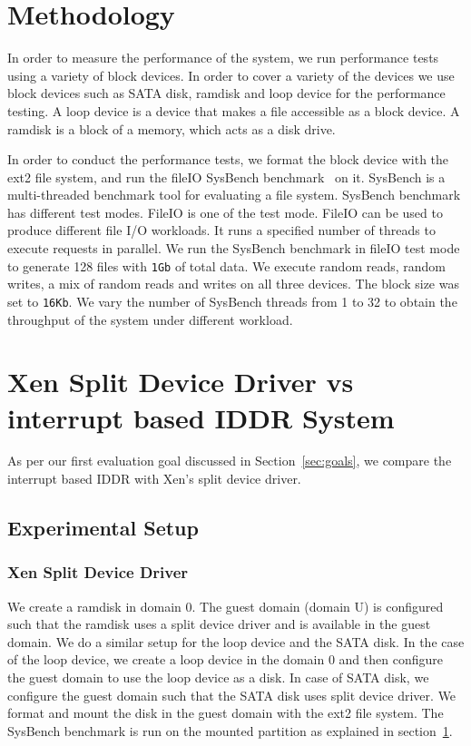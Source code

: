 \section{Methodology}
\label{sec:methodology}
In order to measure the performance of the system, we run performance tests using a variety of block devices. In order to cover a variety of the devices we use block devices such as SATA disk, ramdisk and loop device for the performance testing. A loop device is a device that makes a file accessible as a block device. A ramdisk is a block of a memory, which acts as a disk drive. 

In order to conduct the performance tests, we format the block device with the ext2 file system, and run the fileIO SysBench benchmark~\cite{sysbench} on it. SysBench is a multi-threaded benchmark tool for evaluating a file system. SysBench benchmark has different test modes. FileIO is one of the test mode. FileIO can be used to produce different file I/O workloads. It runs a specified number of threads to execute requests in parallel. We run the SysBench benchmark in fileIO test mode to generate 128 files with \texttt{1Gb} of total data. We execute random reads, random writes, a mix of random reads and writes on all three devices. The block size was set to \texttt{16Kb}. We vary the number of SysBench threads from 1 to 32 to obtain the throughput of the system under different workload. 

\section{Xen Split Device Driver vs interrupt based IDDR System}
As per our first evaluation goal discussed in Section~\ref{sec:goals}, we compare the interrupt based IDDR with Xen's split device driver. 

\subsection*{Experimental Setup}

\subsubsection*{Xen Split Device Driver}
We create a ramdisk in domain 0. The guest domain (domain U) is configured such that the ramdisk uses a split device driver and is available in the guest domain. We do a similar setup for the loop device and the SATA disk. In the case of the loop device, we create a loop device in the domain 0 and then configure the guest domain to use the loop device as a disk. In case of SATA disk, we configure the guest domain such that the SATA disk uses split device driver. We format and mount the disk in the guest domain with the ext2 file system. The SysBench benchmark is run on the mounted partition as explained in section~\ref{sec:methodology}.

